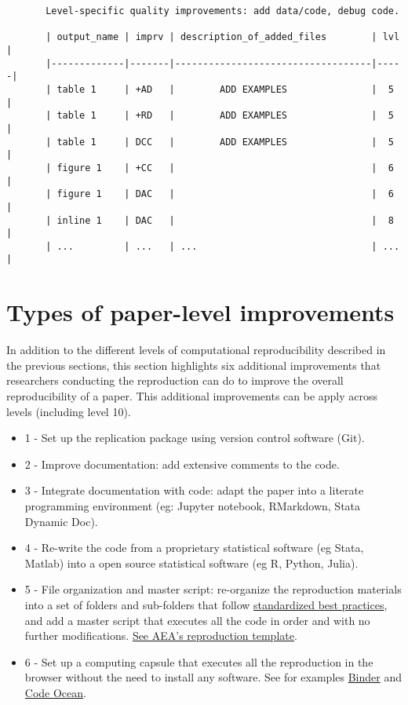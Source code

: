 \documentclass[]{book}
\providecommand{\tightlist}{%
  \setlength{\itemsep}{0pt}\setlength{\parskip}{0pt}}
\begin{document}
\begin{verbatim}
       Level-specific quality improvements: add data/code, debug code.

       | output_name | imprv | description_of_added_files        | lvl |
       |-------------|-------|-----------------------------------|-----|
       | table 1     | +AD   |        ADD EXAMPLES               |  5  |
       | table 1     | +RD   |        ADD EXAMPLES               |  5  |
       | table 1     | DCC   |        ADD EXAMPLES               |  5  |
       | figure 1    | +CC   |                                   |  6  |
       | figure 1    | DAC   |                                   |  6  |
       | inline 1    | DAC   |                                   |  8  |
       | ...         | ...   | ...                               | ... |  
\end{verbatim}

\hypertarget{types-of-paper-level-improvements}{%
\section{Types of paper-level improvements}\label{types-of-paper-level-improvements}}

In addition to the different levels of computational reproducibility described in the previous sections, this section highlights six additional improvements that researchers conducting the reproduction can do to improve the overall reproducibility of a paper. This additional improvements can be apply across levels (including level 10).

\begin{itemize}
\tightlist
\item
  1 - Set up the replication package using version control software (Git).
\item
  2 - Improve documentation: add extensive comments to the code.
\item
  3 - Integrate documentation with code: adapt the paper into a literate programming environment (eg: Jupyter notebook, RMarkdown, Stata Dynamic Doc).
\item
  4 - Re-write the code from a proprietary statistical software (eg Stata, Matlab) into a open source statistical software (eg R, Python, Julia).
\item
  5 - File organization and master script: re-organize the reproduction materials into a set of folders and sub-folders that follow \href{https://www.projecttier.org/tier-protocol/specifications/\#overview-of-the-documentation}{standardized best practices}, and add a master script that executes all the code in order and with no further modifications. \href{https://github.com/AEADataEditor/replication-template}{See AEA's reproduction template}.\\
\item
  6 - Set up a computing capsule that executes all the reproduction in the browser without the need to install any software. See for examples \href{https://mybinder.org/}{Binder} and \href{https://codeocean.com/}{Code Ocean}.
\end{itemize}
\end{document}
